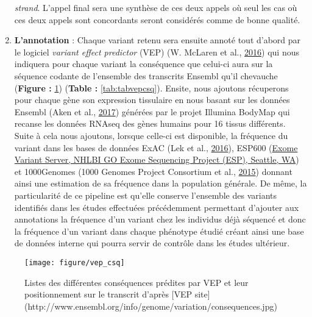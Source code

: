 \documentclass[12pt,twoside]{reedthesis}
\theoremstyle{definition}
\theoremstyle{definition}
\theoremstyle{remark}
\begin{document}
\begin{enumerate}
    \emph{strand}. L'appel final sera une synthèse de ces deux appels où
    seul les cas où ces deux appels sont concordants seront considérés
    comme de bonne qualité.\\
  \item
    \textbf{L'annotation} : Chaque variant retenu sera ensuite annoté tout
    d'abord par le logiciel \emph{variant effect predictor} (VEP) (W.
    McLaren et al., \protect\hyperlink{ref-McLaren2016}{2016}) qui nous
    indiquera pour chaque variant la conséquence que celui-ci aura sur la
    séquence codante de l'ensemble des transcrits Ensembl qu'il chevauche
    (\textbf{Figure : }\ref{fig:figvepcsq}) (\textbf{Table :
    }\ref{tab:tabvepcsq}). Ensite, nous ajoutons récuperons pour chaque
    gène son expression tissulaire en nous basant sur les données Ensembl
    (Aken et al., \protect\hyperlink{ref-Aken2017}{2017}) générées par le
    projet Illumina BodyMap qui recanse les données RNAseq des gènes
    humains pour 16 tissus différents. Suite à cela nous ajoutons, lorsque
    celle-ci est disponible, la fréquence du variant dans les bases de
    données ExAC (Lek et al., \protect\hyperlink{ref-Lek2016}{2016}),
    ESP600 (\href{http://evs.gs.washington.edu/EVS/}{Exome Variant Server,
    NHLBI GO Exome Sequencing Project (ESP), Seattle, WA}) et 1000Genomes
    (1000 Genomes Project Consortium et al.,
    \protect\hyperlink{ref-1000GenomesProjectConsortium2015}{2015})
    donnant ainsi une estimation de sa fréquence dans la population
    générale. De même, la particularité de ce pipeline est qu'elle
    conserve l'ensemble des variants identifiés dans les études effectuées
    précédemment permettant d'ajouter aux annotations la fréquence d'un
    variant chez les individus déjà séquencé et donc la fréquence d'un
    variant dans chaque phénotype étudié créant ainsi une base de données
    interne qui pourra servir de contrôle dans les études ultérieur.
  \end{enumerate}
  
  \begin{figure}
  
  {\centering \texttt{[image: figure/vep\_csq]} 
  
  }
  
  \caption[Listes des différentes conséquences prédites par VEP et leur positionnement sur le transcrit]{Listes des différentes conséquences prédites par VEP et leur positionnement sur le transcrit d'après [VEP site](http://www.ensembl.org/info/genome/variation/consequences.jpg)}\label{fig:figvepcsq}
  \end{figure}
  
\end{document}
